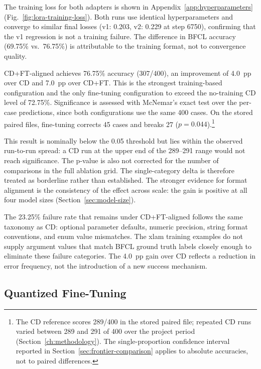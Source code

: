 The training loss for both adapters is shown in
Appendix~\ref{app:hyperparameters} (Fig.~\ref{fig:lora-training-loss}).
Both runs use identical hyperparameters and converge to similar final losses
(v1: 0.203, v2: 0.229 at step 6750), confirming that the v1 regression is
not a training failure. The difference in BFCL accuracy (69.75\% vs.\
76.75\%) is attributable to the training format, not to convergence quality.

CD+FT-aligned achieves 76.75\% accuracy (307/400), an improvement
of 4.0~pp over CD and 7.0~pp over CD+FT. This is the strongest
training-based configuration and the only fine-tuning configuration
to exceed the no-training CD level of 72.75\%. Significance is
assessed with McNemar's exact test over the per-case predictions,
since both configurations use the same 400 cases. On the stored
paired files, fine-tuning corrects 45 cases and breaks 27
($p = 0.044$).\footnote{The CD reference scores 289/400 in the stored
paired file; repeated CD runs varied between 289 and 291 of 400 over
the project period (Section~\ref{ch:methodology}). The single-proportion
confidence interval reported in Section~\ref{sec:frontier-comparison}
applies to absolute accuracies, not to paired differences.}

This result is nominally below the 0.05 threshold but lies within the
observed run-to-run spread: a CD run at the upper end of the 289--291
range would not reach significance. The p-value is also not corrected for the
number of comparisons in the full ablation grid. The single-category delta is
therefore treated as borderline rather than established. The stronger evidence
for format alignment is the consistency of the effect across scale: the gain is
positive at all four model sizes (Section~\ref{sec:model-size}).

The 23.25\% failure rate that remains under CD+FT-aligned follows
the same taxonomy as CD: optional parameter defaults, numeric
precision, string format conventions, and enum value mismatches. The xlam
training examples do not supply argument values that match BFCL ground
truth labels closely enough to eliminate these failure categories. The
4.0~pp gain over CD reflects a reduction in error frequency, not
the introduction of a new success mechanism.

\subsection{Quantized Fine-Tuning}
\label{sec:cdqft}

